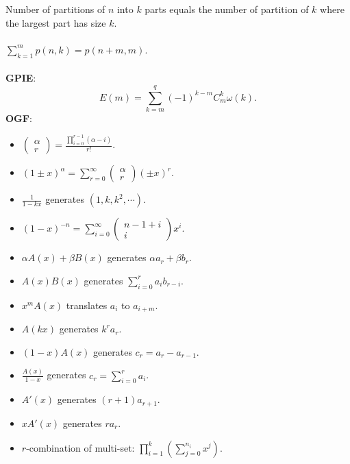 \documentclass[11pt]{article}
\begin{document}
\begin{multicols*}{3}
        Number of partitions of $n$ into $k$ parts equals the number of partition of $k$ where the largest part has size $k$.
        \\\\
        $\sum_{k = 1}^{m}p(n, k) = p(n + m, m)$.
        \\\\
        \textbf{GPIE}: 
        \begin{equation*}
            E(m) = \sum_{k = m}^{q}(-1)^{k - m}C^k_m\omega(k).
        \end{equation*}
        \textbf{OGF}:
        \begin{itemize}
            \item $\begin{pmatrix}
                \alpha \\
                r
            \end{pmatrix} = \frac{\prod_{i = 0}^{r - 1}(\alpha - i)}{r!}$.
            \item $(1 \pm x)^\alpha = \sum_{r = 0}^{\infty}\begin{pmatrix}
                \alpha \\
                r
            \end{pmatrix}(\pm x)^r$.
            \item $\frac{1}{1 - kx}$ generates $(1, k, k^2, \cdots)$.
            \item $(1 - x)^{-n} = \sum_{i = 0}^{\infty}\begin{pmatrix}
                n - 1 + i \\
                i
            \end{pmatrix}x^i$.
            \item $\alpha A(x) + \beta B(x)$ generates $\alpha a_r + \beta b_r$.
            \item $A(x)B(x)$ generates $\sum_{i = 0}^{r}a_ib_{r - i}$.
            \item $x^mA(x)$ translates $a_i$ to $a_{i + m}$.
            \item $A(kx)$ generates $k^ra_r$.
            \item $(1 - x)A(x)$ generates $c_r = a_r - a_{r - 1}$.
            \item $\frac{A(x)}{1 - x}$ generates $c_r = \sum_{i = 0}^{r}a_i$.
            \item $A'(x)$ generates $(r + 1)a_{r + 1}$.
            \item $xA'(x)$ generates $ra_r$.
            \item $r$-combination of multi-set: $\prod_{i = 1}^{k}\left(\sum_{j = 0}^{n_i}x^j\right)$.

\end{itemize}
\end{multicols*}
\end{document}
